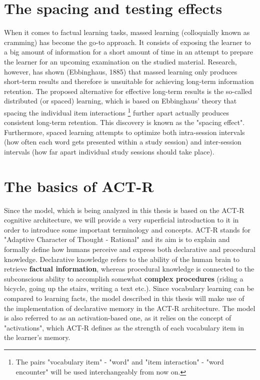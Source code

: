 \documentclass[a4paper]{report}
\begin{document}
\section{The spacing and testing effects}
When it comes to factual learning tasks, massed learning (colloquially known as cramming) has become the go-to approach. It consists of exposing the learner to a big amount of information for a short amount of time in an attempt to prepare the learner for an upcoming examination on the studied material. Research, however, has shown (Ebbinghaus, 1885) that massed learning only produces short-term results and therefore is unsuitable for achieving long-term information retention. The proposed alternative for effective long-term results is the so-called distributed (or spaced) learning, which is based on Ebbinghaus' theory that spacing the individual item interactions \footnote{The pairs "vocabulary item" - "word" and "item interaction" - "word encounter" will be used interchangeably from now on.} further apart actually produces consistent long-term retention. This discovery is known as the "spacing effect". Furthermore, spaced learning attempts to optimize both intra-session intervals (how often each word gets presented within a study session) and inter-session intervals (how far apart individual study sessions should take place).

\section{The basics of ACT-R}
Since the model, which is being analyzed in this thesis is based on the ACT-R cognitive architecture, we will provide a very superficial introduction to it in order to introduce some important terminology and concepts. ACT-R stands for "Adaptive Character of Thought - Rational" and its aim is to explain and formally define how humans perceive and express both declarative and procedural knowledge. Declarative knowledge refers to the ability of the human brain to retrieve \textbf{factual information}, whereas procedural knowledge is connected to the subconscious ability to accomplish somewhat \textbf{complex procedures} (riding a bicycle, going up the stairs, writing a text etc.). Since vocabulary learning can be compared to learning facts, the model described in this thesis will make use of the implementation of declarative memory in the ACT-R architecture. The model is also referred to as an activation-based one, as it relies on the concept of "activations", which ACT-R defines as the strength of each vocabulary item in the learner's memory. \cite{woudenberg08}
\end{document}
